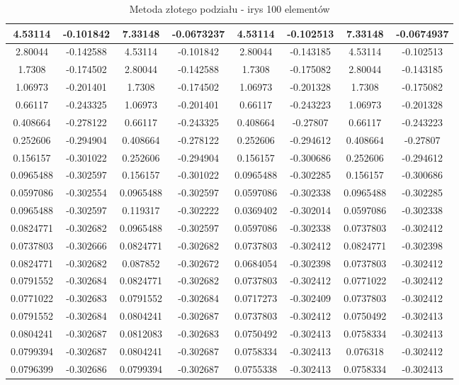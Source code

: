 \begin{table}[H]
{\begin{tabular}{|c|c|c|c|c|c|c|c|}
4.53114   & -0.101842    & 7.33148   & -0.0673237   & 4.53114   & -0.102513    & 7.33148   & -0.0674937   \\ \hline
2.80044   & -0.142588    & 4.53114   & -0.101842    & 2.80044   & -0.143185    & 4.53114   & -0.102513    \\ \hline
1.7308    & -0.174502    & 2.80044   & -0.142588    & 1.7308    & -0.175082    & 2.80044   & -0.143185    \\ \hline
1.06973   & -0.201401    & 1.7308    & -0.174502    & 1.06973   & -0.201328    & 1.7308    & -0.175082    \\ \hline
0.66117   & -0.243325    & 1.06973   & -0.201401    & 0.66117   & -0.243223    & 1.06973   & -0.201328    \\ \hline
0.408664  & -0.278122    & 0.66117   & -0.243325    & 0.408664  & -0.27807     & 0.66117   & -0.243223    \\ \hline
0.252606  & -0.294904    & 0.408664  & -0.278122    & 0.252606  & -0.294612    & 0.408664  & -0.27807     \\ \hline
0.156157  & -0.301022    & 0.252606  & -0.294904    & 0.156157  & -0.300686    & 0.252606  & -0.294612    \\ \hline
0.0965488 & -0.302597    & 0.156157  & -0.301022    & 0.0965488 & -0.302285    & 0.156157  & -0.300686    \\ \hline
0.0597086 & -0.302554    & 0.0965488 & -0.302597    & 0.0597086 & -0.302338    & 0.0965488 & -0.302285    \\ \hline
0.0965488 & -0.302597    & 0.119317  & -0.302222    & 0.0369402 & -0.302014    & 0.0597086 & -0.302338    \\ \hline
0.0824771 & -0.302682    & 0.0965488 & -0.302597    & 0.0597086 & -0.302338    & 0.0737803 & -0.302412    \\ \hline
0.0737803 & -0.302666    & 0.0824771 & -0.302682    & 0.0737803 & -0.302412    & 0.0824771 & -0.302398    \\ \hline
0.0824771 & -0.302682    & 0.087852  & -0.302672    & 0.0684054 & -0.302398    & 0.0737803 & -0.302412    \\ \hline
0.0791552 & -0.302684    & 0.0824771 & -0.302682    & 0.0737803 & -0.302412    & 0.0771022 & -0.302412    \\ \hline
0.0771022 & -0.302683    & 0.0791552 & -0.302684    & 0.0717273 & -0.302409    & 0.0737803 & -0.302412    \\ \hline
0.0791552 & -0.302684    & 0.0804241 & -0.302687    & 0.0737803 & -0.302412    & 0.0750492 & -0.302413    \\ \hline
0.0804241 & -0.302687    & 0.0812083 & -0.302683    & 0.0750492 & -0.302413    & 0.0758334 & -0.302413    \\ \hline
0.0799394 & -0.302687    & 0.0804241 & -0.302687    & 0.0758334 & -0.302413    & 0.076318  & -0.302412    \\ \hline
0.0796399 & -0.302686    & 0.0799394 & -0.302687    & 0.0755338 & -0.302413    & 0.0758334 & -0.302413    \\ \hline
\end{tabular}%
}
\caption{Metoda złotego podziału - irys 100 elementów}
\end{table}

